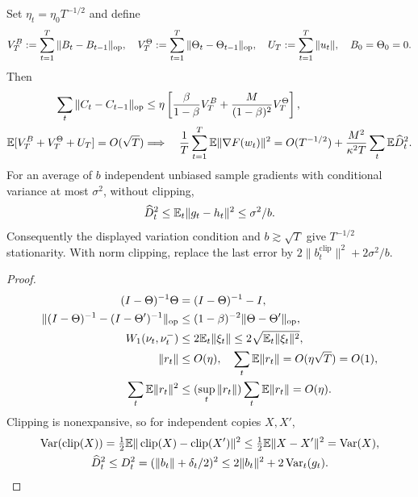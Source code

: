 \begin{corollary}\label{cor:actual-rate}
Set $\eta_t=\eta_0T^{-1/2}$ and define
\begin{gather}
 V_T^B:=\sum_{t=1}^T\|B_t-B_{t-1}\|_{\mathrm{op}},\quad
 V_T^\Theta:=\sum_{t=1}^T\|\Theta_t-\Theta_{t-1}\|_{\mathrm{op}},\quad
 U_T:=\sum_{t=1}^T\|u_t\|,\quad B_0=\Theta_0=0.
\end{gather}
Then
\begin{align}
 \sum_t\|C_t-C_{t-1}\|_{\mathrm{op}}
 &\le\eta\left[\frac\beta{1-\beta}V_T^B+
                             \frac{M}{(1-\beta)^2}V_T^\Theta\right],\\
 \mathbb E[V_T^B+V_T^\Theta+U_T]=O(\sqrt T)
 &\Longrightarrow\quad
 \frac1T\sum_{t=1}^T\mathbb E\|\nabla F(w_t)\|^2
 =O(T^{-1/2})+\frac{M^2}{\kappa^2T}\sum_t\mathbb E \widehat D_t^2.
\end{align}
For an average of $b$ independent unbiased sample gradients with conditional
variance at most $\sigma^2$, without clipping,
\begin{equation}
 \widehat D_t^2\le\mathbb E_t\|g_t-h_t\|^2\le\sigma^2/b.
\end{equation}
Consequently the displayed variation condition and $b\gtrsim\sqrt T$ give
$T^{-1/2}$ stationarity. With norm clipping, replace the last error by
$2\|b_t^{\mathrm{clip}}\|^2+2\sigma^2/b$.
\end{corollary}
\begin{proof}
\begin{align}
 (I-\Theta)^{-1}\Theta&=(I-\Theta)^{-1}-I,\\
 \|(I-\Theta)^{-1}-(I-\Theta')^{-1}\|_{\mathrm{op}}
 &\le(1-\beta)^{-2}\|\Theta-\Theta'\|_{\mathrm{op}},\\
 W_1(\nu_t,\nu_t^-)&\le2\mathbb E_t\|\xi_t\|
 \le2\sqrt{\mathbb E_t\|\xi_t\|^2},\\
 \|r_t\|&\le O(\eta),\quad
 \sum_t\mathbb E\|r_t\|=O(\eta\sqrt T)=O(1),\\
 \sum_t\mathbb E\|r_t\|^2&\le(\sup_t\|r_t\|)\sum_t\mathbb E\|r_t\|=O(\eta).
\end{align}
Clipping is nonexpansive, so for independent copies $X,X'$,
\begin{gather}
 \operatorname{Var}(\operatorname{clip}(X))
 =\tfrac12\mathbb E\|\operatorname{clip}(X)-\operatorname{clip}(X')\|^2
 \le\tfrac12\mathbb E\|X-X'\|^2=\operatorname{Var}(X),\\
 \widehat D_t^2\le D_t^2=(\|b_t\|+\delta_t/2)^2
 \le2\|b_t\|^2+2\operatorname{Var}_t(g_t).
\end{gather}
\end{proof}
